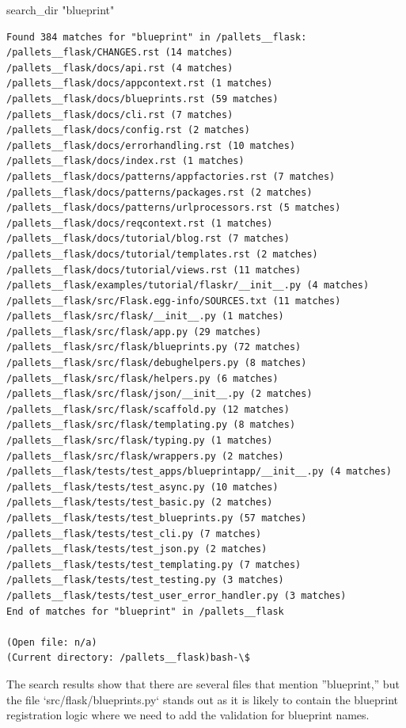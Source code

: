 {\begin{agentbox}
\hrulefill
\begin{CodeVerbatim}[breaklines=true, breakanywhere=true]
search_dir "blueprint"
\end{CodeVerbatim}
\end{agentbox}
\begin{observationbox}\begin{Verbatim}[breaklines=true, breakanywhere=true]
Found 384 matches for "blueprint" in /pallets__flask:
/pallets__flask/CHANGES.rst (14 matches)
/pallets__flask/docs/api.rst (4 matches)
/pallets__flask/docs/appcontext.rst (1 matches)
/pallets__flask/docs/blueprints.rst (59 matches)
/pallets__flask/docs/cli.rst (7 matches)
/pallets__flask/docs/config.rst (2 matches)
/pallets__flask/docs/errorhandling.rst (10 matches)
/pallets__flask/docs/index.rst (1 matches)
/pallets__flask/docs/patterns/appfactories.rst (7 matches)
/pallets__flask/docs/patterns/packages.rst (2 matches)
/pallets__flask/docs/patterns/urlprocessors.rst (5 matches)
/pallets__flask/docs/reqcontext.rst (1 matches)
/pallets__flask/docs/tutorial/blog.rst (7 matches)
/pallets__flask/docs/tutorial/templates.rst (2 matches)
/pallets__flask/docs/tutorial/views.rst (11 matches)
/pallets__flask/examples/tutorial/flaskr/__init__.py (4 matches)
/pallets__flask/src/Flask.egg-info/SOURCES.txt (11 matches)
/pallets__flask/src/flask/__init__.py (1 matches)
/pallets__flask/src/flask/app.py (29 matches)
/pallets__flask/src/flask/blueprints.py (72 matches)
/pallets__flask/src/flask/debughelpers.py (8 matches)
/pallets__flask/src/flask/helpers.py (6 matches)
/pallets__flask/src/flask/json/__init__.py (2 matches)
/pallets__flask/src/flask/scaffold.py (12 matches)
/pallets__flask/src/flask/templating.py (8 matches)
/pallets__flask/src/flask/typing.py (1 matches)
/pallets__flask/src/flask/wrappers.py (2 matches)
/pallets__flask/tests/test_apps/blueprintapp/__init__.py (4 matches)
/pallets__flask/tests/test_async.py (10 matches)
/pallets__flask/tests/test_basic.py (2 matches)
/pallets__flask/tests/test_blueprints.py (57 matches)
/pallets__flask/tests/test_cli.py (7 matches)
/pallets__flask/tests/test_json.py (2 matches)
/pallets__flask/tests/test_templating.py (7 matches)
/pallets__flask/tests/test_testing.py (3 matches)
/pallets__flask/tests/test_user_error_handler.py (3 matches)
End of matches for "blueprint" in /pallets__flask

(Open file: n/a)
(Current directory: /pallets__flask)bash-\$
\end{Verbatim}
\end{observationbox}
\begin{agentbox}
The search results show that there are several files that mention ''blueprint,'' but the file `src/flask/blueprints.py` stands out as it is likely to contain the blueprint registration logic where we need to add the validation for blueprint names.




\end{agentbox}}
